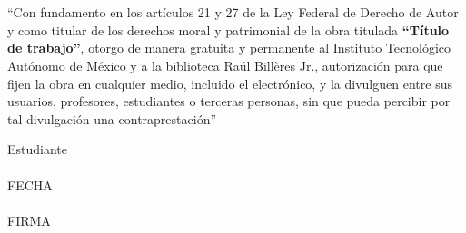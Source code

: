 \section*{\phantom{Declaración}}
``Con fundamento en los artículos 21 y 27 de la Ley Federal de Derecho de Autor
y como titular de los derechos moral y patrimonial de la obra titulada
\textbf{``Título de trabajo''}, otorgo de manera gratuita y permanente al
Instituto Tecnológico Autónomo de México y a la biblioteca Raúl Billères Jr.,
autorización para que fijen la obra en cualquier medio, incluido el electrónico,
y la divulguen entre sus usuarios, profesores, estudiantes o terceras personas,
sin que pueda percibir por tal divulgación una contraprestación'' \vspace{2em}
\\ \begin{center} \vspace{2em}
    {Estudiante } \\
    \phantom{espacio} \vspace{5em}
    \underline{ }\\
    \small{FECHA}      \\
    \phantom{espacio} \vspace{5em}
    \underline{ }\\
    \small{FIRMA}
      \end{center}